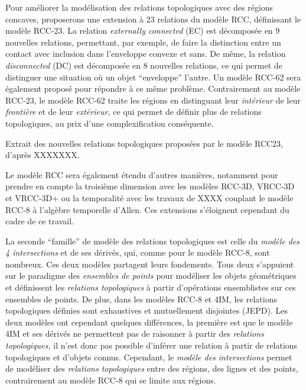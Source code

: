 Pour améliorer la modélisation des relations topologiques avec des
régions concaves, \textcite{Cohn1997} proposerons une extension à 23
relations du modèle RCC, définissant le modèle RCC-23. La relation
\emph{externally connected} (EC) est décomposée en 9 nouvelles
relations, permettant, par exemple, de faire la distinction entre un
contact avec inclusion dans l'enveloppe convexe et sans. De même, la
relation \emph{disconnected} (DC) est décomposée en 8 nouvelles
relations, ce qui permet de distinguer une situation où un objet
\enquote{enveloppe} l'autre. Un modèle RCC-62 sera également proposé
pour répondre à ce même problème. Contrairement au modèle RCC-23, le
modèle RCC-62 traite les régions en distinguant leur \emph{intérieur}
de leur \emph{frontière} et de leur \emph{extérieur,} ce qui permet de
définir plus de relations topologiques, au prix d'une complexification
conséquente.

\begin{table}
  \centering
  \caption{Extrait des nouvelles relations topologiques proposées par
le modèle RCC23, d'après XXXXXXX.}
  \label{tab:RCC8_vs_RCC23}
\end{table}

Le modèle RCC sera également étendu d'autres manières, notamment pour
prendre en compte la troisième dimension avec les modèles RCC-3D,
VRCC-3D et VRCC-3D+ ou la temporalité avec les travaux de XXXX
couplant le modèle RCC-8 à l'algèbre temporelle d'Allen. Ces
extensions s'éloignent cependant du cadre de ce travail.

La seconde \enquote{famille} de modèle des relations topologiques est
celle du \emph{modèle des 4 intersections}
\autocite[4IM,][]{Egenhofer1989} et de ses dérivés, qui, comme pour le
modèle RCC-8, sont nombreux. Ces deux modèles partagent leurs
fondements. Tous deux s’appuient sur le paradigme des \emph{ensembles
  de points} pour modéliser les objets géométriques et définissent les
\emph{relations topologiques} à partir d'opérations ensemblistes sur
ces ensembles de points. De plus, dans les modèles RCC-8
\autocite{Randell1992} et 4IM, les relations topologiques définies
sont exhaustives et mutuellement disjointes (JEPD). Les deux modèles
ont cependant quelques différences, la première est que le modèle 4IM
et ses dérivés ne permettent pas de raisonner à partir des
\emph{relations topologiques,} il n'est donc pas possible d'inférer
une relation à partir de relations topologiques et d'objets
connus. Cependant, le \emph{modèle des intersections} permet de
modéliser des \emph{relations topologiques} entre des régions, des
lignes et des points, contrairement au modèle RCC-8 qui se limite aux
régions.

